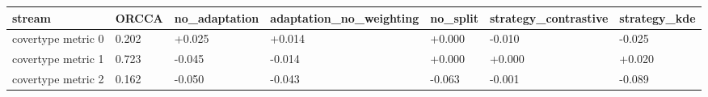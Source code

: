 \begin{tabular}{lllllll}
\hline
 stream             & ORCCA   & no\_adaptation   & adaptation\_no\_weighting   & no\_split   & strategy\_contrastive   & strategy\_kde   \\
\hline
 covertype metric 0 & 0.202   & +0.025          & +0.014                    & +0.000     & -0.010                 & -0.025         \\
 covertype metric 1 & 0.723   & -0.045          & -0.014                    & +0.000     & +0.000                 & +0.020         \\
 covertype metric 2 & 0.162   & -0.050          & -0.043                    & -0.063     & -0.001                 & -0.089         \\
\hline
\end{tabular}